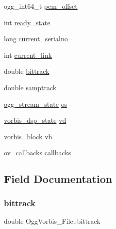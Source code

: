 \begin{DoxyCompactItemize}
\item 
ogg\+\_\+int64\+\_\+t \hyperlink{struct_ogg_vorbis___file_a23d5ba7ca52640ceb6f633a46304cdc5}{pcm\+\_\+offset}
\item 
int \hyperlink{struct_ogg_vorbis___file_ad304fe18bebc075c34f2e5ec7d1f2a99}{ready\+\_\+state}
\item 
long \hyperlink{struct_ogg_vorbis___file_ad7545f86b92a6d66641f3d04a2497763}{current\+\_\+serialno}
\item 
int \hyperlink{struct_ogg_vorbis___file_a9b2d64c3739364ac4c08070aac2e0588}{current\+\_\+link}
\item 
double \hyperlink{struct_ogg_vorbis___file_aa72a11d9f154636d4dc9edac4c9eb843}{bittrack}
\item 
double \hyperlink{struct_ogg_vorbis___file_a3fcbfeaad027ada99496dfcaf94866a9}{samptrack}
\item 
\hyperlink{structogg__stream__state}{ogg\+\_\+stream\+\_\+state} \hyperlink{struct_ogg_vorbis___file_a8658f17a6f662a74f8763c47d560d712}{os}
\item 
\hyperlink{structvorbis__dsp__state}{vorbis\+\_\+dsp\+\_\+state} \hyperlink{struct_ogg_vorbis___file_acb9d38719f54642d1a39f24203b466d6}{vd}
\item 
\hyperlink{structvorbis__block}{vorbis\+\_\+block} \hyperlink{struct_ogg_vorbis___file_a3201599977a781b7bf559167cd892638}{vb}
\item 
\hyperlink{structov__callbacks}{ov\+\_\+callbacks} \hyperlink{struct_ogg_vorbis___file_afb1474e24193f577dd21395a76199415}{callbacks}
\end{DoxyCompactItemize}


\subsection{Field Documentation}
\mbox{\label{struct_ogg_vorbis___file_aa72a11d9f154636d4dc9edac4c9eb843}} 
\subsubsection{\texorpdfstring{bittrack}{bittrack}}
{\footnotesize\ttfamily double Ogg\+Vorbis\+\_\+\+File\+::bittrack}

\mbox{\label{struct_ogg_vorbis___file_afb1474e24193f577dd21395a76199415}} 
